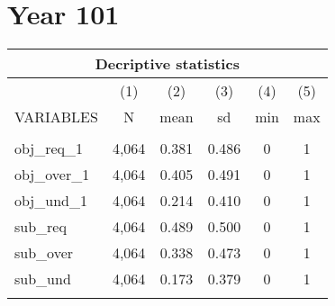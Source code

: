 \documentclass[]{article}
\begin{document}
\section*{Year 101}
\begin{tabular}{lccccc}
\multicolumn{6}{c}{Decriptive statistics} \\ \hline
 & (1) & (2) & (3) & (4) & (5) \\
VARIABLES & N & mean & sd & min & max \\ \hline
 &  &  &  &  &  \\
obj\_req\_1 & 4,064 & 0.381 & 0.486 & 0 & 1 \\
obj\_over\_1 & 4,064 & 0.405 & 0.491 & 0 & 1 \\
obj\_und\_1 & 4,064 & 0.214 & 0.410 & 0 & 1 \\
sub\_req & 4,064 & 0.489 & 0.500 & 0 & 1 \\
sub\_over & 4,064 & 0.338 & 0.473 & 0 & 1 \\
sub\_und & 4,064 & 0.173 & 0.379 & 0 & 1 \\
 &  &  &  &  &  \\ \hline
\end{tabular}
\end{document}
